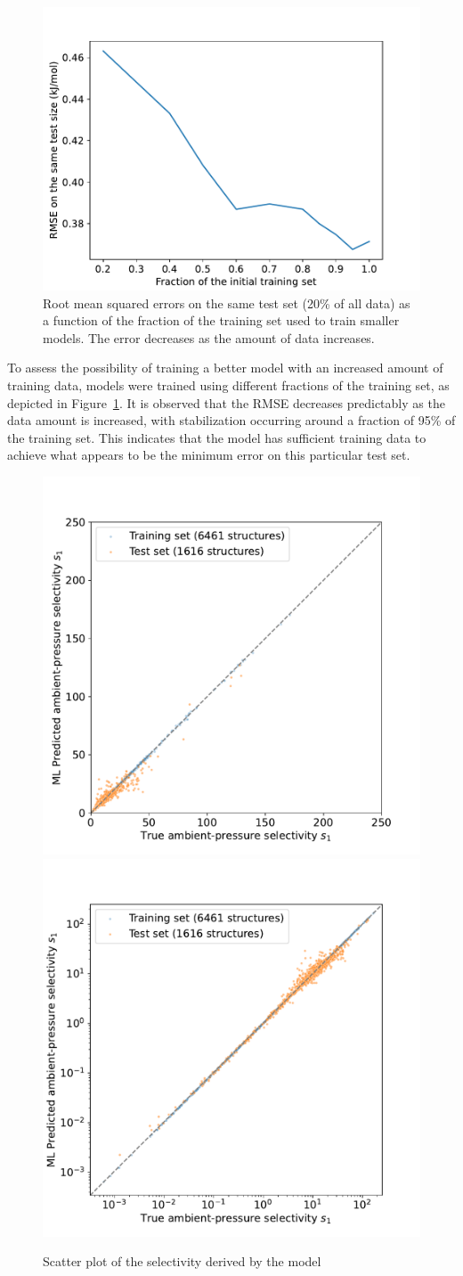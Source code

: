 \documentclass[main]{subfiles}
\begin{document}
\begin{figure}[ht]
  \centering
    \includegraphics[width=0.5\linewidth]{figures/4-ml/main/training_curve.pdf}
    \caption{ Root mean squared errors on the same test set (20\% of all data) as a function of the fraction of the training set used to train smaller models. The error decreases as the amount of data increases. }\label{fgr:training_curve}
  \end{figure}

To assess the possibility of training a better model with an increased amount of training data, models were trained using different fractions of the training set, as depicted in Figure~\ref{fgr:training_curve}. It is observed that the RMSE decreases predictably as the data amount is increased, with stabilization occurring around a fraction of 95\% of the training set. This indicates that the model has sufficient training data to achieve what appears to be the minimum error on this particular test set.



\begin{figure}[ht]
  \centering
    \includegraphics[width=0.48\linewidth]{figures/4-ml/SI_figure/Scatterplot_S1_prediction.pdf}
    \includegraphics[width=0.48\linewidth]{figures/4-ml/SI_figure/Scatterplot_S1_prediction_logscale.pdf}
    \caption{Scatter plot of the selectivity derived by the model}\label{fgr:S1_prediction}
  \end{figure}
\end{document}
